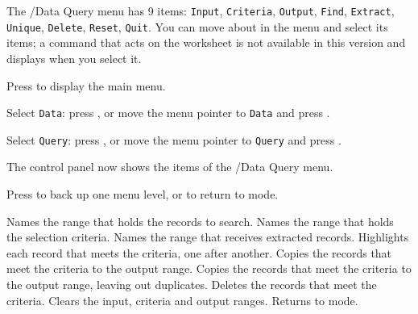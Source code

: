 The /Data Query menu has 9 items: \texttt{Input}, \texttt{Criteria}, \texttt{Output}, \texttt{Find}, \texttt{Extract}, \texttt{Unique}, \texttt{Delete}, \texttt{Reset}, \texttt{Quit}.  You can move about in the menu and select its items; a command that acts on the worksheet is not available in this version and displays  when you select it.
\begin{Steps123}
\item Press  to display the main menu.
\item Select \texttt{Data}: press , or move the menu pointer to \texttt{Data} and press .
\item Select \texttt{Query}: press , or move the menu pointer to \texttt{Query} and press .
\item The control panel now shows the items of the /Data Query menu.
\item Press  to back up one menu level, or  to return to  mode.
\end{Steps123}
\begin{Options}
 Names the range that holds the records to search.
 Names the range that holds the selection criteria.
 Names the range that receives extracted records.
 Highlights each record that meets the criteria, one after another.
 Copies the records that meet the criteria to the output range.
 Copies the records that meet the criteria to the output range, leaving out duplicates.
 Deletes the records that meet the criteria.
 Clears the input, criteria and output ranges.
 Returns to  mode.
\end{Options}

